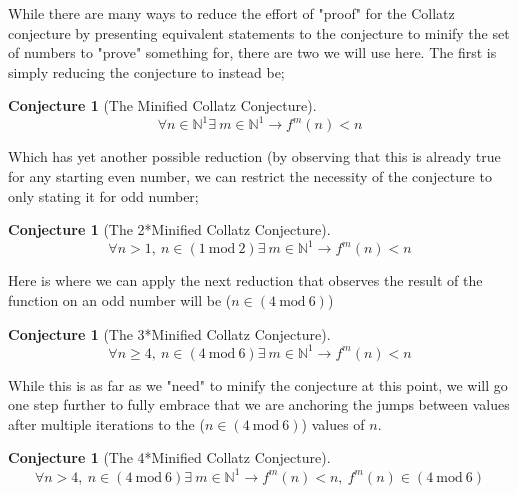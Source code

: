 \documentclass[12pt,a4paper]{amsart}
\numberwithin{equation}{section}
\theoremstyle{plain}
\theoremstyle{definition}
\newtheorem{Conj}[Th]{Conjecture}
\begin{document}
While there are many ways to reduce the effort of "proof" for the Collatz conjecture by presenting equivalent statements to the conjecture to minify the set of numbers to "prove" something for, there are two we will use here. The first is simply reducing the conjecture to instead be;

\begin{Conj}[The Minified Collatz Conjecture]
\begin{equation}
\forall n \in \mathbb{N}^{1} \exists \: m \in \mathbb{N}^{1} \rightarrow f^{m}\left ( n \right )<n
\end{equation}
\end{Conj}

Which has yet another possible reduction (by observing that this is already true for any starting even number, we can restrict the necessity of the conjecture to only stating it for odd number;

\begin{Conj}[The 2*Minified Collatz Conjecture]
\begin{equation}
\forall n>1\mathrm{,}\:n \in \left ( 1\:\mathrm{mod}\:2 \right ) \exists \: m \in \mathbb{N}^{1} \rightarrow f^{m}\left ( n \right )<n
\end{equation}
\end{Conj}

Here is where we can apply the next reduction that observes the result of the function on an odd number will be ($n \in \left ( 4\:\mathrm{mod}\:6 \right )$)

\begin{Conj}[The 3*Minified Collatz Conjecture]
\begin{equation}
\forall n\geq4\mathrm{,}\:n \in \left ( 4\:\mathrm{mod}\:6 \right ) \exists \: m \in \mathbb{N}^{1} \rightarrow f^{m}\left ( n \right )<n
\end{equation}
\end{Conj}

While this is as far as we "need" to minify the conjecture at this point, we will go one step further to fully embrace that we are anchoring the jumps between values after multiple iterations to the ($n \in \left ( 4\:\mathrm{mod}\:6 \right )$) values of $n$.

\begin{Conj}[The 4*Minified Collatz Conjecture]
\begin{equation}
\forall n>4\mathrm{,}\:n \in \left ( 4\:\mathrm{mod}\:6 \right ) \exists \: m \in \mathbb{N}^{1} \rightarrow f^{m}\left ( n \right )<n\mathrm{,}\:f^{m}\left ( n \right ) \in \left ( 4\:\mathrm{mod}\:6 \right )
\end{equation}
\end{Conj}
\end{document}
